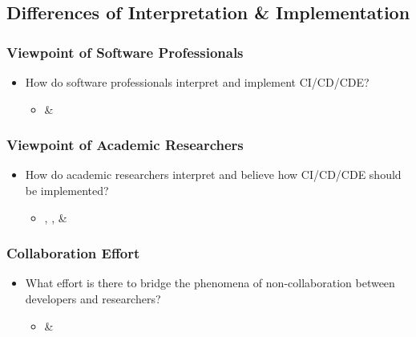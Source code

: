 \documentclass[12pt,a4paper]{article}
\begin{document}
    
    \subsection{Differences of Interpretation \& Implementation}
        \subsubsection{Viewpoint of Software Professionals}
        \begin{itemize}[noitemsep]
            \item How do software professionals interpret and implement CI/CD/CDE?
            \begin{itemize}
                \item \cite{atkinson_edwards_2018} \& \cite{stackify_2018}
            \end{itemize}
        \end{itemize}
        \subsubsection{Viewpoint of Academic Researchers}
        \begin{itemize}[noitemsep]
            \item How do academic researchers interpret and believe how CI/CD/CDE should be implemented?
            \begin{itemize}
                \item \cite{bosch_2014}, \cite{shahin_babar_zhu_2017}, \& \cite{stahl_2017}
            \end{itemize}
        \end{itemize}
        \subsubsection{Collaboration Effort}
        \begin{itemize}[noitemsep]
            \item What effort is there to bridge the phenomena of non-collaboration between developers and researchers?
            \begin{itemize}
                \item \cite{bosch_2014} \& \cite{stahl_2017}
            \end{itemize}
        \end{itemize}
\end{document}
